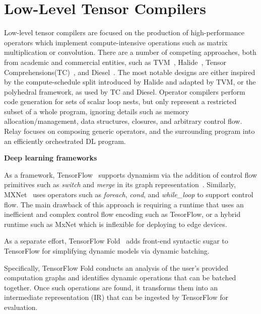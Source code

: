 \section{Low-Level Tensor Compilers}
Low-level tensor compilers are focused on the production
    of high-performance operators which implement compute-intensive
    operations such as matrix multiplication or convolution.
There are a number of competing approaches,
    both from academic and commercial entities, such as
    TVM~\citep{tvm_osdi18}, Halide~\citep{halide}, Tensor Comprehensions(TC)~\citep{tensor_comprehensions},
    and Diesel~\citep{diesel}.
The most notable designs are either inspired by the
    compute-schedule split introduced by Halide
    and adapted by TVM, or the polyhedral framework,
    as used by TC and Diesel.
Operator compilers perform code generation for sets of scalar loop nests,
    but only represent a restricted subset of a whole program, ignoring details such as
    memory allocation/management, data structures, closures, and arbitrary control flow.
Relay focuses on composing generic operators, and the surrounding program
    into an efficiently orchestrated DL program.


    {\bf Deep learning frameworks}

    As a framework, TensorFlow~\citep{tensorflow} supports dynamism via the addition
    of control flow primitives such as \emph{switch} and \emph{merge} in its graph
    representation~\citep{yu2018dynamic}. Similarly, MXNet~\citep{mxnet, mxnet-control}
    uses operators such as {\em foreach}, {\em cond}, and {\em while\_loop} to support control flow.
     The main drawback of this approach is requiring a runtime that uses an inefficient and complex
     control flow encoding such as TesorFlow, or a hybrid runtime such as MxNet which is inflexible
     for deploying to edge devices.

     As a separate effort, TensorFlow Fold~\citep{tensorflowfold} adds front-end
     syntactic sugar to TensorFlow for simplifying dynamic models via dynamic batching.

     Specifically, TensorFlow Fold conducts an analysis of the user's provided computation
     graphs and identifies dynamic operations that can be batched together. Once such operations
     are found, it transforms them into an intermediate representation (IR) that can be
     ingested by TensorFlow for evaluation.

